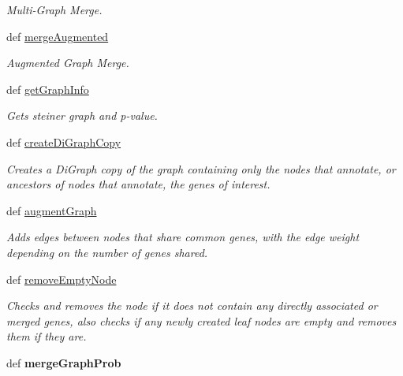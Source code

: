 \begin{DoxyCompactItemize}
\begin{DoxyCompactList}\small\item\em Multi-\/\-Graph Merge. \end{DoxyCompactList}\item 
def \hyperlink{classgographer_1_1_g_o_gene_pubmed_graph_1_1_g_o_gene_pubmed_graph_af6522527bb436dfd862d4c60d93c3fa1}{merge\-Augmented}
\begin{DoxyCompactList}\small\item\em Augmented Graph Merge. \end{DoxyCompactList}\item 
def \hyperlink{classgographer_1_1_g_o_gene_pubmed_graph_1_1_g_o_gene_pubmed_graph_a6841cc14cc8e345aec74590fd8302bb9}{get\-Graph\-Info}
\begin{DoxyCompactList}\small\item\em Gets steiner graph and p-\/value. \end{DoxyCompactList}\item 
def \hyperlink{classgographer_1_1_g_o_gene_pubmed_graph_1_1_g_o_gene_pubmed_graph_a421ce63e7d47fd4c4bd1df3e55b8f180}{create\-Di\-Graph\-Copy}
\begin{DoxyCompactList}\small\item\em Creates a Di\-Graph copy of the graph containing only the nodes that annotate, or ancestors of nodes that annotate, the genes of interest. \end{DoxyCompactList}\item 
def \hyperlink{classgographer_1_1_g_o_gene_pubmed_graph_1_1_g_o_gene_pubmed_graph_a3a4964654724f0a716aa5bd98c45c218}{augment\-Graph}
\begin{DoxyCompactList}\small\item\em Adds edges between nodes that share common genes, with the edge weight depending on the number of genes shared. \end{DoxyCompactList}\item 
def \hyperlink{classgographer_1_1_g_o_gene_pubmed_graph_1_1_g_o_gene_pubmed_graph_a8a4f36c28c64041a147f2847e313f94f}{remove\-Empty\-Node}
\begin{DoxyCompactList}\small\item\em Checks and removes the node if it does not contain any directly associated or merged genes, also checks if any newly created leaf nodes are empty and removes them if they are. \end{DoxyCompactList}\item 
\hypertarget{classgographer_1_1_g_o_gene_pubmed_graph_1_1_g_o_gene_pubmed_graph_a4b48cabd6d6d54ac8c6a2471019e8b6c}{def {\bfseries merge\-Graph\-Prob}}\label{classgographer_1_1_g_o_gene_pubmed_graph_1_1_g_o_gene_pubmed_graph_a4b48cabd6d6d54ac8c6a2471019e8b6c}

\end{DoxyCompactItemize}
